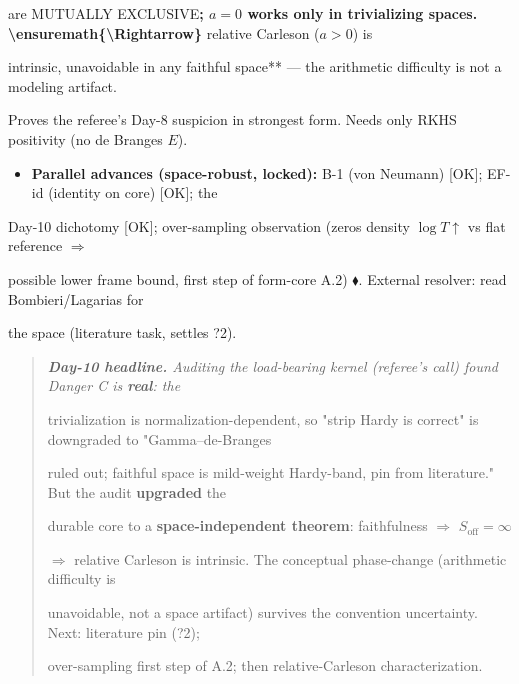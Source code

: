\documentclass[10pt]{article}
\begin{document}
  are MUTUALLY EXCLUSIVE\textbf{; $a=0$ works only in trivializing spaces. \textbackslash{}ensuremath\{\textbackslash{}Rightarrow\} }relative Carleson ($a>0$) is\par
  intrinsic, unavoidable in any faithful space** --- the arithmetic difficulty is not a modeling artifact.\par
  Proves the referee's Day-8 suspicion in strongest form. Needs only RKHS positivity (no de Branges $E$).\par
\begin{itemize}
\item \textbf{Parallel advances (space-robust, locked):} B-1 (von Neumann) [OK]; EF-id (identity on core) [OK]; the
\end{itemize}
  Day-10 dichotomy [OK]; over-sampling observation (zeros density $\log T\uparrow$ vs flat reference \ensuremath{\Rightarrow}\par
  possible lower frame bound, first step of form-core A.2) $\blacklozenge$. External resolver: read Bombieri/Lagarias for\par
  the space (literature task, settles ?2).\par

\begin{quote}\itshape
\textbf{Day-10 headline.} Auditing the load-bearing kernel (referee's call) found Danger C is \textbf{real}: the\par
trivialization is normalization-dependent, so "strip Hardy is correct" is downgraded to "Gamma--de-Branges\par
ruled out; faithful space is mild-weight Hardy-band, pin from literature." But the audit \textbf{upgraded} the\par
durable core to a \textbf{space-independent theorem}: faithfulness $\Rightarrow$ $S_{\mathrm{off}}=\infty$\par
$\Rightarrow$ relative Carleson is intrinsic. The conceptual phase-change (arithmetic difficulty is\par
unavoidable, not a space artifact) survives the convention uncertainty. Next: literature pin (?2);\par
over-sampling first step of A.2; then relative-Carleson characterization.\par
\end{quote}
\end{document}
